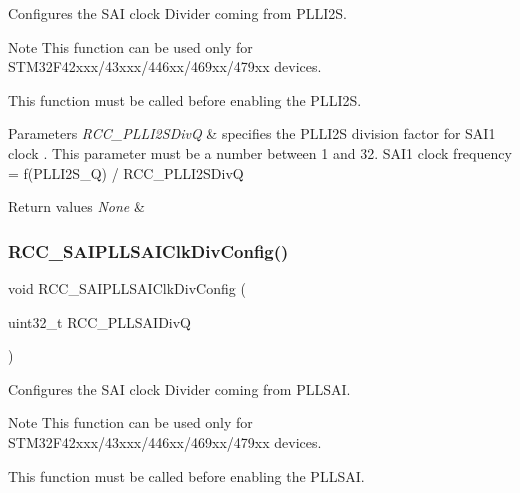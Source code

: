 Configures the S\+AI clock Divider coming from P\+L\+L\+I2S. 

\begin{DoxyNote}{Note}
This function can be used only for S\+T\+M32\+F42xxx/43xxx/446xx/469xx/479xx devices.

This function must be called before enabling the P\+L\+L\+I2S.
\end{DoxyNote}

\begin{DoxyParams}{Parameters}
{\em R\+C\+C\+\_\+\+P\+L\+L\+I2\+S\+DivQ} & specifies the P\+L\+L\+I2S division factor for S\+A\+I1 clock . This parameter must be a number between 1 and 32. S\+A\+I1 clock frequency = f(\+P\+L\+L\+I2\+S\+\_\+\+Q) / R\+C\+C\+\_\+\+P\+L\+L\+I2\+S\+DivQ\\
\hline
\end{DoxyParams}

\begin{DoxyRetVals}{Return values}
{\em None} & \\
\hline
\end{DoxyRetVals}
\mbox{\label{group___r_c_c_gabefc354915bd57804329349ec3f33fab}} 
\subsubsection{\texorpdfstring{R\+C\+C\+\_\+\+S\+A\+I\+P\+L\+L\+S\+A\+I\+Clk\+Div\+Config()}{RCC\_SAIPLLSAIClkDivConfig()}}
{\footnotesize\ttfamily void R\+C\+C\+\_\+\+S\+A\+I\+P\+L\+L\+S\+A\+I\+Clk\+Div\+Config (\begin{DoxyParamCaption}\item[{uint32\+\_\+t}]{R\+C\+C\+\_\+\+P\+L\+L\+S\+A\+I\+DivQ }\end{DoxyParamCaption})}



Configures the S\+AI clock Divider coming from P\+L\+L\+S\+AI. 

\begin{DoxyNote}{Note}
This function can be used only for S\+T\+M32\+F42xxx/43xxx/446xx/469xx/479xx devices.

This function must be called before enabling the P\+L\+L\+S\+AI.
\end{DoxyNote}


